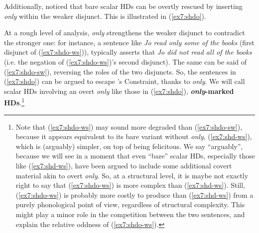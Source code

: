 \begin{exe}
	\ex\label{ex7:shd}
	\begin{xlist}
		\label{ex7:shd-ws}
		\label{ex7:shd-sw}
	\end{xlist}
\end{exe}

Additionally, \citeauthor{Singh2008} noticed that bare scalar HDs can be overtly rescued by inserting \textit{only} within the weaker disjunct. This is illustrated in (\ref{ex7:shdo}).

\begin{exe}
	\ex\label{ex7:shdo}
	\begin{xlist}
		\label{ex7:shdo-ws}
		\label{ex7:shdo-sw}
	\end{xlist}
\end{exe}


At a rough level of analysis, \textit{only} strengthens the weaker disjunct to contradict the stronger one: for instance, a sentence like \textit{Jo read only some of the books} (first disjunct of (\ref{ex7:shdo-ws})), typically asserts that \textit{Jo did not read all of the books} (i.e. the negation of (\ref{ex7:shdo-ws})'s second disjunct). The same can be said of (\ref{ex7:shdo-sw}), reversing the roles of the two disjuncts. So, the sentences in (\ref{ex7:shdo}) can be argued to escape \citeauthor{Hurford1974}'s Constraint, thanks to \textit{only}. We will call scalar HDs involving an overt \textit{only} like those in (\ref{ex7:shdo}), \textbf{\textit{only}-marked HDs}.\footnote{Note that (\ref{ex7:shdo-ws}) may sound more degraded than (\ref{ex7:shdo-sw}), because it appears equivalent to its bare variant without \textit{only}, (\ref{ex7:shd-ws}), which is (arguably) simpler, on top of being felicitous. We say ``arguably'', because we will see in a moment that even ``bare'' scalar HDs, especially those like (\ref{ex7:shd-ws}), have been argued to include some additional covert material akin to overt \textit{only}. So, at a structural level, it is maybe not exactly right to say that (\ref{ex7:shdo-ws}) is more complex than (\ref{ex7:shd-ws}). Still, (\ref{ex7:shdo-ws}) is probably more costly to produce than (\ref{ex7:shd-ws}) from a purely phonological point of view, regardless of structural complexity. This might play a minor role in the competition between the two sentences, and explain the relative oddness of (\ref{ex7:shdo-ws}).}\\




